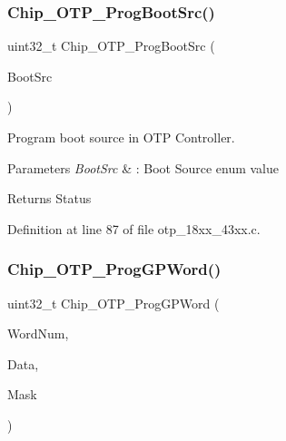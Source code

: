 \subsubsection{\texorpdfstring{Chip\+\_\+\+O\+T\+P\+\_\+\+Prog\+Boot\+Src()}{Chip\_OTP\_ProgBootSrc()}}
{\footnotesize\ttfamily uint32\+\_\+t Chip\+\_\+\+O\+T\+P\+\_\+\+Prog\+Boot\+Src (\begin{DoxyParamCaption}\item[{\hyperlink{group___o_t_p__18_x_x__43_x_x_gada36d39d34c8821f0416a852faa926f6}{C\+H\+I\+P\+\_\+\+O\+T\+P\+\_\+\+B\+O\+O\+T\+\_\+\+S\+R\+C\+\_\+T}}]{Boot\+Src }\end{DoxyParamCaption})}



Program boot source in O\+TP Controller. 


\begin{DoxyParams}{Parameters}
{\em Boot\+Src} & \+: Boot Source enum value \\
\hline
\end{DoxyParams}
\begin{DoxyReturn}{Returns}
Status 
\end{DoxyReturn}


Definition at line 87 of file otp\+\_\+18xx\+\_\+43xx.\+c.

\mbox{\label{group___o_t_p__18_x_x__43_x_x_gae9fc592f60829d5aefd72c9dbe83a58a}} 
\subsubsection{\texorpdfstring{Chip\+\_\+\+O\+T\+P\+\_\+\+Prog\+G\+P\+Word()}{Chip\_OTP\_ProgGPWord()}}
{\footnotesize\ttfamily uint32\+\_\+t Chip\+\_\+\+O\+T\+P\+\_\+\+Prog\+G\+P\+Word (\begin{DoxyParamCaption}\item[{uint32\+\_\+t}]{Word\+Num,  }\item[{uint32\+\_\+t}]{Data,  }\item[{uint32\+\_\+t}]{Mask }\end{DoxyParamCaption})}



